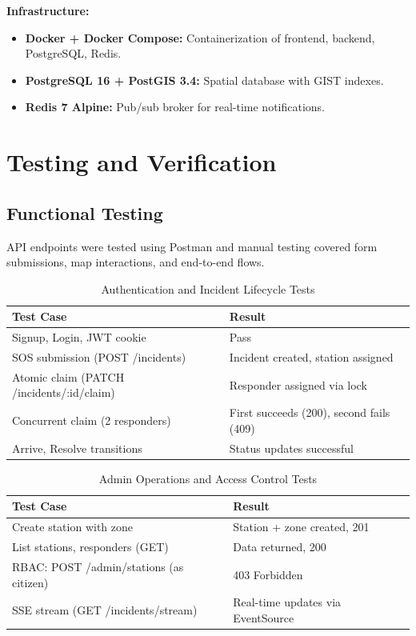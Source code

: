 \textbf{Infrastructure:}
\begin{itemize}
  \item \textbf{Docker + Docker Compose:} Containerization of frontend, backend, PostgreSQL, Redis.
  \item \textbf{PostgreSQL 16 + PostGIS 3.4:} Spatial database with GIST indexes.
  \item \textbf{Redis 7 Alpine:} Pub/sub broker for real-time notifications.
\end{itemize}

\section{Testing and Verification}

\subsection{Functional Testing}

API endpoints were tested using Postman and manual testing covered form submissions, map interactions, and end-to-end flows.

\begin{table}[H]
\centering
\caption{Authentication and Incident Lifecycle Tests}
\begin{tabularx}{\textwidth}{|X|X|}
\hline
\textbf{Test Case} & \textbf{Result} \\
\hline
Signup, Login, JWT cookie & Pass \\
\hline
SOS submission (POST /incidents) & Incident created, station assigned \\
\hline
Atomic claim (PATCH /incidents/:id/claim) & Responder assigned via lock \\
\hline
Concurrent claim (2 responders) & First succeeds (200), second fails (409) \\
\hline
Arrive, Resolve transitions & Status updates successful \\
\hline
\end{tabularx}
\end{table}

\begin{table}[H]
\centering
\caption{Admin Operations and Access Control Tests}
\begin{tabularx}{\textwidth}{|X|X|}
\hline
\textbf{Test Case} & \textbf{Result} \\
\hline
Create station with zone & Station + zone created, 201 \\
\hline
List stations, responders (GET) & Data returned, 200 \\
\hline
RBAC: POST /admin/stations (as citizen) & 403 Forbidden \\
\hline
SSE stream (GET /incidents/stream) & Real-time updates via EventSource \\
\hline
\end{tabularx}
\end{table}

